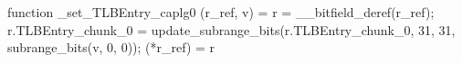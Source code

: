function _set_TLBEntry_caplg0 (r_ref, v) = {
    r = __bitfield_deref(r_ref);
    r.TLBEntry_chunk_0 = update_subrange_bits(r.TLBEntry_chunk_0, 31, 31, subrange_bits(v, 0, 0));
    (*r_ref) = r
}
